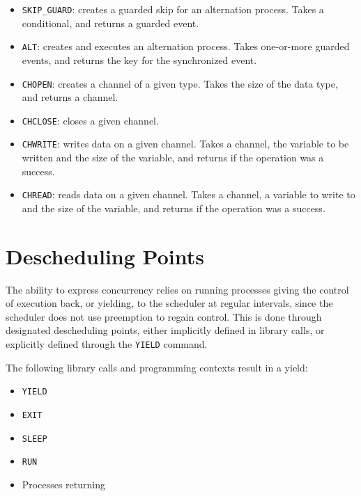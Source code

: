 \begin{itemize}[topsep=0em,itemsep=-1em,partopsep=0.5em,parsep=1em]
    \item \texttt{SKIP\_GUARD}: creates a guarded skip for an alternation process. Takes a conditional, and returns a guarded event.
    \item \texttt{ALT}: creates and executes an alternation process. Takes one\hyp{}or\hyp{}more guarded events, and returns the key for the synchronized event. 
    \item \texttt{CHOPEN}: creates a channel of a given type. Takes the size of the data type, and returns a channel.
    \item \texttt{CHCLOSE}: closes a given channel.
    \item \texttt{CHWRITE}: writes data on a given channel. Takes a channel, the variable to be written and the size of the variable, and returns if the operation was a success.
    \item \texttt{CHREAD}: reads data on a given channel. Takes a channel, a variable to write to and the size of the variable, and returns if the operation was a success.
\end{itemize}


\section{Descheduling Points}
\label{sec:descheduling_points}

The ability to express concurrency relies on running processes giving the control of execution back, or yielding, to the scheduler at regular intervals, since the scheduler does not use preemption to regain control. This is done through designated descheduling points, either implicitly defined in library calls, or explicitly defined through the \texttt{YIELD} command.

The following library calls and programming contexts \underline{} result in a yield:

\begin{multicols}{2}
\begin{itemize}[topsep=0em,itemsep=-1em,partopsep=0.5em,parsep=1em]
    \item \texttt{YIELD}
    \item \texttt{EXIT}
    \item \texttt{SLEEP}
    \item \texttt{RUN}
    \item Processes returning
\end{itemize}
\end{multicols}

